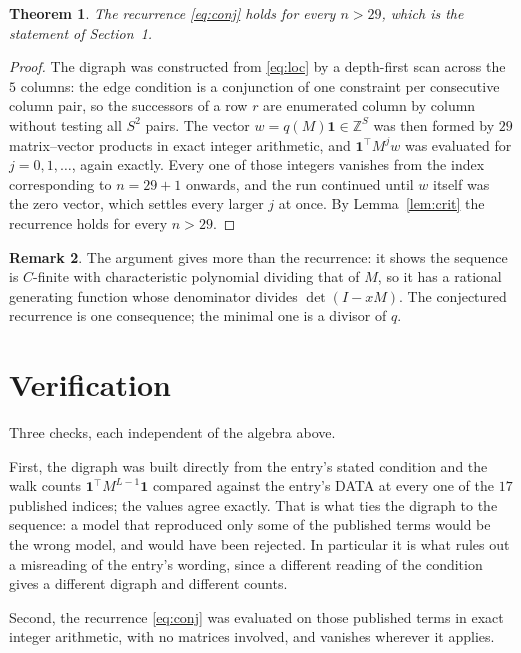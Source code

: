\documentclass[11pt,a4paper]{article}
\theoremstyle{plain}
\newtheorem{theorem}{Theorem}
\theoremstyle{definition}
\newtheorem{remark}[theorem]{Remark}
\begin{document}
\begin{theorem}
The recurrence \eqref{eq:conj} holds for every $n>29$, which is the statement of
Section~1.
\end{theorem}

\begin{proof}
The digraph was constructed from \eqref{eq:loc} by a depth-first scan across the $5$
columns: the edge condition is a conjunction of one constraint per consecutive column
pair, so the successors of a row $r$ are enumerated column by column without testing all
$S^2$ pairs. The vector $w=q(M)\mathbf{1}\in\mathbb{Z}^{S}$ was then formed by $29$
matrix--vector products in exact integer arithmetic, and $\mathbf{1}^{\!\top}M^{j}w$ was
evaluated for $j=0,1,\dots$, again exactly. Every one of those integers vanishes from the
index corresponding to $n=29+1$ onwards, and the run continued until $w$ itself was the
zero vector, which settles every larger $j$ at once. By Lemma~\ref{lem:crit} the recurrence
holds for every $n>29$.
\end{proof}

\begin{remark}
The argument gives more than the recurrence: it shows the sequence is $C$-finite with
characteristic polynomial dividing that of $M$, so it has a rational generating function
whose denominator divides $\det(I-xM)$. The conjectured recurrence is one consequence; the
minimal one is a divisor of $q$.
\end{remark}

\section{Verification}

Three checks, each independent of the algebra above.

First, the digraph was built directly from the entry's stated condition and the walk counts
$\mathbf{1}^{\!\top}M^{L-1}\mathbf{1}$ compared against the entry's DATA at
every one of the $17$ published indices; the values agree exactly. That is what ties
the digraph to the sequence: a model that reproduced only some of the published terms would
be the wrong model, and would have been rejected. In particular it is what rules out a
misreading of the entry's wording, since a different reading of the condition gives a
different digraph and different counts.

Second, the recurrence \eqref{eq:conj} was evaluated on those published terms in exact
integer arithmetic, with no matrices involved, and vanishes wherever it applies.
\end{document}

